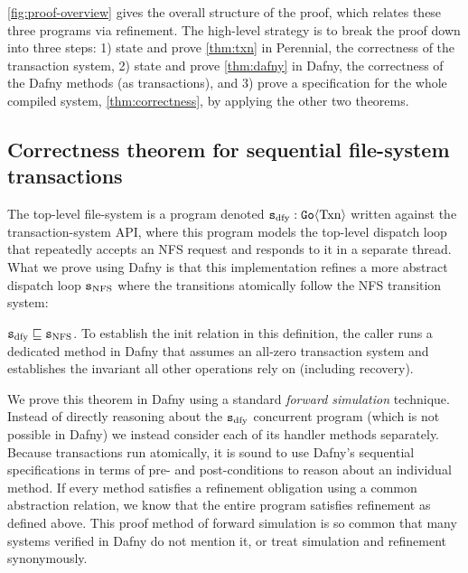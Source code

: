 \autoref{fig:proof-overview} gives the overall structure of the proof, which
relates these three programs via refinement. The high-level strategy is to break the proof down
into three steps: 1) state and prove \autoref{thm:txn} in Perennial, the correctness
of the transaction system, 2) state and prove \autoref{thm:dafny} in Dafny, the
correctness of the Dafny methods (as transactions), and 3) prove a specification
for the whole compiled system, \autoref{thm:correctness}, by applying the other
two theorems.

\subsection{Correctness theorem for sequential file-system transactions}
\label{sec:proof:dafny}

The top-level file-system is a program denoted $\texttt{s}_{\mathrm{dfy}} : \mathtt{Go}\langle \mathrm{Txn} \rangle$
written against the transaction-system API, where this program models the
top-level dispatch loop that repeatedly accepts an NFS request and responds to
it in a separate thread. What we prove using Dafny is that this implementation
refines a more abstract dispatch loop $\texttt{s}_{\mathrm{NFS}}$ where the transitions atomically
follow the NFS transition system:

\begin{theorem}
  $\texttt{s}_{\mathrm{dfy}} \sqsubseteq \texttt{s}_{\mathrm{NFS}}$. To establish the init relation in this definition,
  the caller runs a dedicated method in Dafny that assumes an all-zero
  transaction system and establishes the invariant all other operations rely on
  (including recovery).
  \label{thm:dafny}
\end{theorem}

We prove this theorem in Dafny using a standard \emph{forward simulation}
technique.  Instead of directly reasoning about the $\texttt{s}_{\mathrm{dfy}}$ concurrent program
(which is not possible in Dafny) we instead consider each of its handler methods
separately. Because transactions run atomically, it is sound to use Dafny's
sequential specifications in terms of pre- and post-conditions to reason about
an individual method. If every method satisfies a refinement obligation using a
common abstraction relation, we know that the entire program satisfies
refinement as defined above. This proof method of forward simulation is
so common that many systems verified in Dafny do not mention it, or treat
simulation and refinement synonymously.

